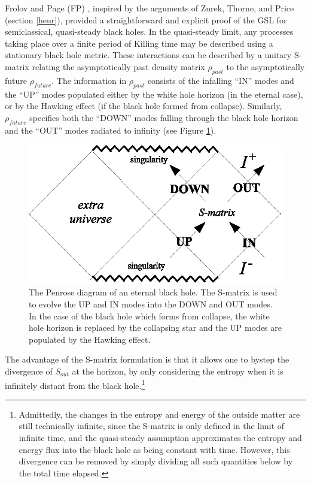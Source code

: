 \documentclass{article}
\begin{document}
Frolov and Page (FP) \cite{FP93}, inspired by the arguments of Zurek, Thorne, and Price \cite{ZT85}\cite{TZP86} (section \ref{heur}), provided a straightforward and explicit proof of the GSL for semiclassical, quasi-steady black holes.  In the quasi-steady limit, any processes taking place over a finite period of Killing time may be described using a stationary black hole metric.  These interactions can be described by a unitary S-matrix relating the asymptotically past density matrix $\rho_{past}$ to the asymptotically future $\rho_{future}$.  The information in $\rho_{past}$ consists of the infalling ``IN'' modes and the ``UP'' modes populated either by the white hole horizon (in the eternal case), or by the Hawking effect (if the black hole formed from collapse).  Similarly, $\rho_{future}$ specifies both the ``DOWN'' modes falling through the black hole horizon and the ``OUT'' modes radiated to infinity  (see Figure \ref{eternal}).
\begin{figure}[ht]
\centering
\includegraphics{eternal.eps}
\caption{The Penrose diagram of an eternal black hole.  The S-matrix is used to evolve the UP and IN modes into the DOWN and OUT modes.  In the case of the black hole which forms from collapse, the white hole horizon is replaced by the collapsing star and the UP modes are populated by the Hawking effect.}\label{eternal}
\end{figure}
The advantage of the S-matrix formulation is that it allows one to bystep the divergence of $S_{out}$ at the horizon, by only considering the entropy when it is infinitely distant from the black hole.\footnote{Admittedly, the changes in the entropy and energy of the outside matter are still technically infinite, since the S-matrix is only defined in the limit of infinite time, and the quasi-steady assumption approximates the entropy and energy flux into the black hole as being constant with time.  However, this divergence can be removed by simply dividing all such quantities below by the total time elapsed.}
\end{document}
